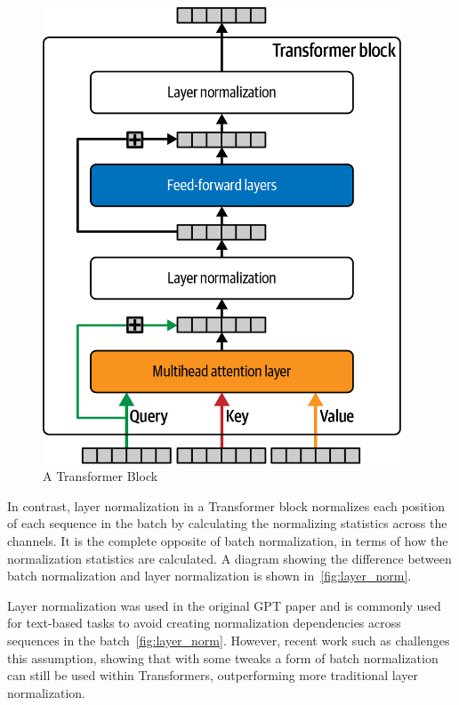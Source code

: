 \begin{figure}
    \begin{center}
        \includegraphics[width=0.95\textwidth]{figures/transformer_block}
    \end{center}
    \caption{A Transformer Block~\cite{foster2022generative}}\label{fig:transformer_block}
\end{figure}

In contrast, layer normalization in a Transformer block normalizes each position of each sequence in the batch by calculating the normalizing statistics across the channels.
It is the complete opposite of batch normalization, in terms of how the normalization statistics are calculated.
A diagram showing the difference between batch normalization and layer normalization is shown in~\autoref{fig:layer_norm}.


Layer normalization was used in the original GPT paper and is commonly used for text-based tasks to avoid creating normalization dependencies across sequences in the batch~\autoref{fig:layer_norm}.
However, recent work such as \textcite{shen2020powernorm} challenges this assumption, showing that with some tweaks a form of batch normalization can still be used within Transformers, outperforming more traditional layer normalization.

